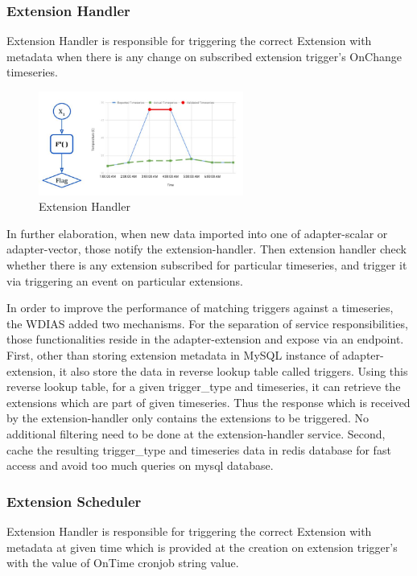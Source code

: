 \subsubsection{Extension Handler}
Extension Handler is responsible for triggering the correct Extension with metadata when there is any change on subscribed extension trigger's OnChange timeseries.
\begin{figure}[htp]
    \centering
    \includegraphics[width=0.6\textwidth]{method/data_preprocess/validation.jpg}
    \caption{Extension Handler}
    \label{fig:extension_handler}
\end{figure}

In further elaboration, when new data imported into one of adapter-scalar or adapter-vector, those notify the extension-handler. Then extension handler check whether there is any extension subscribed for particular timeseries, and trigger it via triggering an event on particular extensions.

In order to improve the performance of matching triggers against a timeseries, the WDIAS added two mechanisms. For the separation of service responsibilities, those functionalities reside in the adapter-extension and expose via an endpoint.
First, other than storing extension metadata in MySQL instance of adapter-extension, it also store the data in reverse lookup table called triggers. Using this reverse lookup table, for a given trigger\_type and timeseries, it can retrieve the extensions which are part of given timeseries. Thus the response which is received by the 
extension-handler only contains the extensions to be triggered. No additional filtering need to be done at the extension-handler service.
Second, cache the resulting trigger\_type and timeseries data in \acrshort{redis} database for fast access and avoid too much queries on \acrshort{mysql} database.

\subsubsection{Extension Scheduler}
Extension Handler is responsible for triggering the correct Extension with metadata at given time which is provided at the creation on extension trigger's with the value of OnTime cronjob string value.

